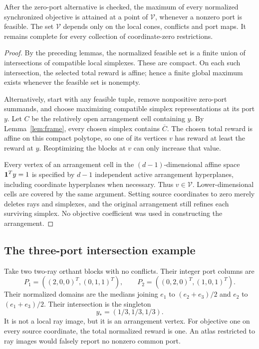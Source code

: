 \begin{theorem}
\label{thm:atlas}
After the zero-port alternative is checked, the maximum of every normalized synchronized objective is attained at a point of $\mathcal V$, whenever a nonzero port is feasible. The set $\mathcal V$ depends only on the local cones, conflicts and port maps. It remains complete for every collection of coordinate-zero restrictions.
\end{theorem}
\begin{proof}
By the preceding lemmas, the normalized feasible set is a finite union of intersections of compatible local simplexes. These are compact. On each such intersection, the selected total reward is affine; hence a finite global maximum exists whenever the feasible set is nonempty.

Alternatively, start with any feasible tuple, remove nonpositive zero-port summands, and choose maximizing compatible simplex representations at its port $y$. Let $C$ be the relatively open arrangement cell containing $y$. By Lemma~\ref{lem:frame}, every chosen simplex contains $\overline C$. The chosen total reward is affine on this compact polytope, so one of its vertices $v$ has reward at least the reward at $y$. Reoptimizing the blocks at $v$ can only increase that value.

Every vertex of an arrangement cell in the $(d-1)$-dimensional affine space $\mathbf1^Ty=1$ is specified by $d-1$ independent active arrangement hyperplanes, including coordinate hyperplanes when necessary. Thus $v\in\mathcal V$. Lower-dimensional cells are covered by the same argument. Setting source coordinates to zero merely deletes rays and simplexes, and the original arrangement still refines each surviving simplex. No objective coefficient was used in constructing the arrangement.
\end{proof}

\subsection{The three-port intersection example}
\begin{example}
\label{ex:centroid}
Take two two-ray orthant blocks with no conflicts. Their integer port columns are
\[
 P_1=((2,0,0)^T,(0,1,1)^T),\qquad
 P_2=((0,2,0)^T,(1,0,1)^T).
\]
Their normalized domains are the medians joining $e_1$ to $(e_2+e_3)/2$ and $e_2$ to $(e_1+e_3)/2$. Their intersection is the singleton
\[
 y_*=(1/3,1/3,1/3).
\]
It is not a local ray image, but it is an arrangement vertex. For objective one on every source coordinate, the total normalized reward is one. An atlas restricted to ray images would falsely report no nonzero common port.
\end{example}

